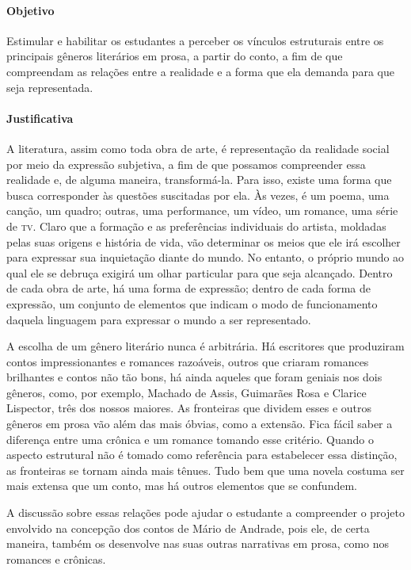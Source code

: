 \documentclass[12pt]{extarticle}
\begin{document}
{\paragraph{Objetivo} Estimular e habilitar os estudantes a perceber os
vínculos estruturais entre os principais gêneros literários em prosa, a
partir do conto, a fim de que compreendam as relações entre a realidade
e a forma que ela demanda para que seja representada.

\paragraph{Justificativa} A literatura, assim como toda obra de arte, é
representação da realidade social por meio da expressão subjetiva, a fim
de que possamos compreender essa realidade e, de alguma maneira,
transformá-la. Para isso, existe uma forma que busca corresponder às
questões suscitadas por ela. Às vezes, é um poema, uma canção, um
quadro; outras, uma performance, um vídeo, um romance, uma série de \textsc{tv}.
Claro que a formação e as preferências individuais do artista, moldadas
pelas suas origens e história de vida, vão determinar os meios que ele
irá escolher para expressar sua inquietação diante do mundo. No entanto,
o próprio mundo ao qual ele se debruça exigirá um olhar particular para
que seja alcançado. Dentro de cada obra de arte, há uma forma de
expressão; dentro de cada forma de expressão, um conjunto de elementos
que indicam o modo de funcionamento daquela linguagem para expressar o
mundo a ser representado.

A escolha de um gênero literário nunca é arbitrária. Há escritores que
produziram contos impressionantes e romances razoáveis, outros que
criaram romances brilhantes e contos não tão bons, há ainda aqueles que
foram geniais nos dois gêneros, como, por exemplo, Machado de Assis,
Guimarães Rosa e Clarice Lispector, três dos nossos maiores. As
fronteiras que dividem esses e outros gêneros em prosa vão além das mais
óbvias, como a extensão. Fica fácil saber a diferença entre uma crônica
e um romance tomando esse critério. Quando o aspecto estrutural não é
tomado como referência para estabelecer essa distinção, as fronteiras se
tornam ainda mais tênues. Tudo bem que uma novela costuma ser mais
extensa que um conto, mas há outros elementos que se confundem.

A discussão sobre essas relações pode ajudar o estudante a compreender o
projeto envolvido na concepção dos contos de Mário de Andrade, pois ele,
de certa maneira, também os desenvolve nas suas outras narrativas em
prosa, como nos romances e crônicas.

}
\end{document}
